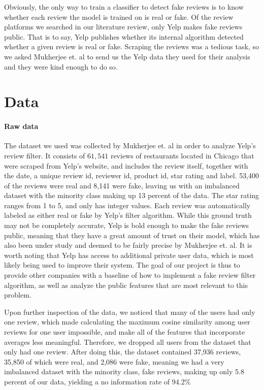 \documentclass[man, floatsintext, 10pt]{apa6}
\begin{document}
Obviously, the only way to train a classifier to detect fake reviews is to know whether each review the model is trained on is real or fake. Of the review platforms we searched in our literature review, only Yelp makes fake reviews public. That is to say, Yelp publishes whether its internal algorithm detected whether a given review is real or fake. Scraping the reviews was a tedious task, so we asked Mukherjee et. al to send us the Yelp data they used for their analysis and they were kind enough to do so. 

\section{Data}

\paragraph{Raw data} The dataset we used was collected by Mukherjee et. al in order to analyze Yelp's review filter. It consists of $61,541$ reviews of restaurants located in Chicago that were scraped from Yelp's website, and includes the review itself, together with the date, a unique review id, reviewer id, product id, star rating and label. 53,400 of the reviews were real and 8,141 were fake, leaving us with an imbalanced dataset with the minority class making up 13 percent of the data. The star rating ranges from 1 to 5, and only has integer values. Each review was automatically labeled as either real or fake by Yelp's filter algorithm. While this ground truth may not be completely accurate, Yelp is bold enough to make the fake reviews public, meaning that they have a great amount of trust on their model, which has also been under study and deemed to be fairly precise by Mukherjee et. al. It is worth noting that Yelp has access to additional private user data, which is most likely being used to improve their system. The goal of our project is thus to provide other companies with a baseline of how to implement a fake review filter algorithm, as well as analyze the public features that are most relevant to this problem. 

Upon further inspection of the data, we noticed that many of the users had only one review, which made calculating the maximum cosine similarity among user reviews for one user impossible, and make all of the features that incorporate averages less meaningful. Therefore, we dropped all users from the dataset that only had one review. After doing this, the dataset contained 37,936 reviews, 35,850 of which were real, and 2,086 were fake, meaning we had a very imbalanced dataset with the minority class, fake reviews, making up only 5.8 percent of our data, yielding a no information rate of 94.2\%
\end{document}
